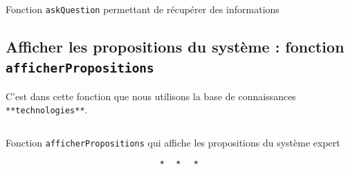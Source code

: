 \documentclass[a4paper,12pt]{article}
\begin{document}
\begin{listing}[H]
	\centering
	\inputminted[breaklines=true,linenos]{lisp}{../askQuestion.lisp}
	\caption{Fonction \texttt{askQuestion} permettant de récupérer des informations}
\end{listing}


\subsection{Afficher les propositions du système : fonction \texttt{afficherPropositions}}

	C'est dans cette fonction que nous utilisons la base de connaissances \texttt{**technologies**}.

\begin{listing}[H]
	\centering
	\inputminted[breaklines=true,linenos]{lisp}{../afficherPropositions.lisp}
	\caption{Fonction \texttt{afficherPropositions} qui affiche les propositions du système expert}
\end{listing}


\[ \star \quad \star \quad \star \]
\newpage

\end{document}
